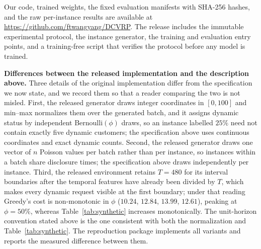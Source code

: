 Our code, trained weights, the fixed evaluation manifests with SHA-256 hashes,
and the raw per-instance results are available at
\url{https://github.com/ftwangyang/DCVRP}. The release includes the immutable
experimental protocol, the instance generator, the training and evaluation
entry points, and a training-free script that verifies the protocol before any
model is trained.



\textbf{Differences between the released implementation and the description
above.} Three details of the original implementation differ from the
specification we now state, and we record them so that a reader comparing the
two is not misled. First, the released generator draws integer coordinates in
$[0,100]$ and min--max normalizes them over the generated batch, and it assigns
dynamic status by independent Bernoulli$(\phi)$ draws, so an instance labelled
$25\%$ need not contain exactly five dynamic customers; the specification above
uses continuous coordinates and exact dynamic counts. Second, the released
generator draws one vector of $n$ Poisson values per batch rather than per
instance, so instances within a batch share disclosure times; the specification
above draws independently per instance. Third, the released environment retains
$T=480$ for its interval boundaries after the temporal features have already
been divided by $T$, which makes every dynamic request visible at the first
boundary; under that reading Greedy's cost is non-monotonic in $\phi$
($10.24$, $12.84$, $13.99$, $12.61$), peaking at $\phi=50\%$, whereas
Table~\ref{tab:synthetic} increases monotonically. The unit-horizon convention
stated above is the one consistent with both the normalization and
Table~\ref{tab:synthetic}. The reproduction package implements all variants and
reports the measured difference between them.
